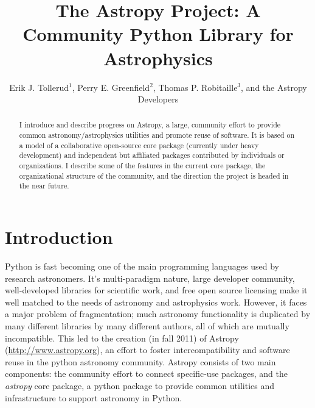 \documentclass[11pt,twoside]{article}
\begin{document}
\title{The Astropy Project: A Community Python Library for Astrophysics}
\author{Erik J. Tollerud$^1$, Perry E. Greenfield$^2$, Thomas P. Robitaille$^3$, and the Astropy Developers
}

\begin{abstract}
I introduce and describe progress on Astropy, a large, community effort to provide common astronomy/astrophysics utilities and promote reuse of software. It is based on a model of a collaborative open-source core package (currently under heavy development) and independent but affiliated packages contributed by individuals or organizations. I  describe some of the features in the current core package, the organizational structure of the community, and the direction the project is headed in the near future.\end{abstract}

\section{Introduction}
Python is fast becoming one of the main programming languages used by research astronomers. It's multi-paradigm nature, large developer community, well-developed libraries for scientific work, and free open source licensing make it well matched to the needs of astronomy and astrophysics work. However, it faces a major problem of fragmentation; much astronomy functionality is duplicated by many different libraries by many different authors, all of which are mutually incompatible.  This led to the creation (in fall 2011) of Astropy (\url{http://www.astropy.org}), an effort to foster intercompatibility and software reuse in the python astronomy community. Astropy consists of two main components: the  community effort to connect specific-use packages, and the {\it astropy} core package, a python package to provide common utilities and infrastructure to support astronomy in Python.
\end{document}
